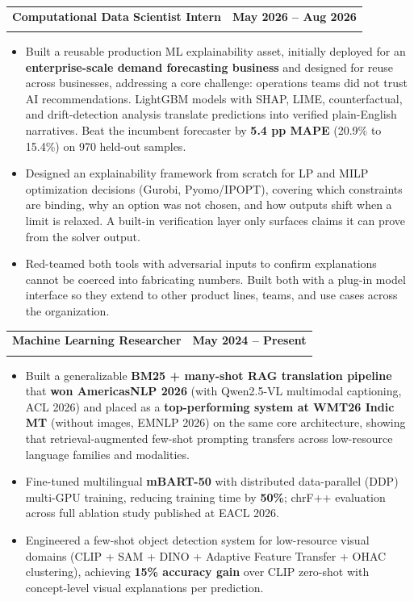 \documentclass[letterpaper,11pt]{article}
\makeatletter
\newcommand{\resumeItem}[1]{
  \item\small{{#1 \vspace{-2pt}}}
}
\newcommand{\resumeSubheading}[4]{
  \vspace{-2pt}\item
    \begin{tabular*}{1.0\textwidth}[t]{l@{\extracolsep{\fill}}r}
      \textbf{#1} & \textbf{\small #2} \\
      \normalfont{\small#3} & \normalfont{\small #4} \\
    \end{tabular*}\vspace{-6pt}
}
\newcommand{\resumeItemListStart}{\begin{itemize}[leftmargin=0.15in]}
\newcommand{\resumeItemListEnd}{\end{itemize}\vspace{-4pt}}
\makeatother
\begin{document}
\resumeSubheading
  {Computational Data Scientist Intern}{May 2026 -- Aug 2026}
  {ExxonMobil}{Houston, TX}
  \resumeItemListStart
    \resumeItem{Built a reusable production ML explainability asset, initially deployed for an
      \textbf{enterprise-scale demand forecasting business} and designed for reuse across businesses,
      addressing a core challenge: operations teams did not trust AI recommendations. LightGBM models
      with SHAP, LIME, counterfactual, and drift-detection analysis translate predictions into verified
      plain-English narratives. Beat the incumbent forecaster by \textbf{5.4 pp MAPE}
      (20.9\% to 15.4\%) on 970 held-out samples.}
    \resumeItem{Designed an explainability framework from scratch for LP and
      MILP optimization decisions (Gurobi, Pyomo/IPOPT),
      covering which constraints are binding, why an option was not chosen,
      and how outputs shift when a limit is relaxed. A built-in verification
      layer only surfaces claims it can prove from the solver output.}
    \resumeItem{Red-teamed both tools with adversarial inputs to confirm
      explanations cannot be coerced into fabricating numbers. Built both
      with a plug-in model interface so they extend to other product lines,
      teams, and use cases across the organization.}
  \resumeItemListEnd
\vspace{-2pt}

\resumeSubheading
  {Machine Learning Researcher}{May 2024 -- Present}
  {Data Science \& Research Lab, University of Florida}{Gainesville, FL}
  \resumeItemListStart
    \resumeItem{Built a generalizable \textbf{BM25 + many-shot RAG translation pipeline}
      that \textbf{won AmericasNLP 2026} (with Qwen2.5-VL multimodal captioning, ACL 2026)
      and placed as a \textbf{top-performing system at WMT26 Indic MT}
      (without images, EMNLP 2026) on the same core architecture,
      showing that retrieval-augmented few-shot prompting transfers across
      low-resource language families and modalities.}
    \resumeItem{Fine-tuned multilingual \textbf{mBART-50} with distributed data-parallel
      (DDP) multi-GPU training, reducing training time by \textbf{50\%}; chrF++ evaluation
      across full ablation study published at EACL 2026.}
    \resumeItem{Engineered a few-shot object detection system for low-resource visual domains
      (CLIP + SAM + DINO + Adaptive Feature Transfer + OHAC clustering),
      achieving \textbf{15\% accuracy gain} over CLIP zero-shot with
      concept-level visual explanations per prediction.}
  \resumeItemListEnd
\vspace{-2pt}
\end{document}
